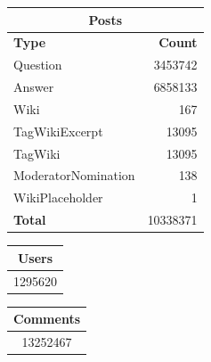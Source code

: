 \documentclass{article}
\begin{document}
\begin{table}[h]
\begin{minipage}[t]{0.45\linewidth}
\begin{tabular}[t]{| l | r |}
\hline
\multicolumn{2}{|c|}{Posts} \\ \hline
\bf{Type} & \bf{Count} \\ \hline
Question & 3453742 \\ \hline
Answer & 6858133 \\ \hline
Wiki & 167 \\ \hline
TagWikiExcerpt & 13095 \\ \hline
TagWiki & 13095 \\ \hline
ModeratorNomination & 138 \\ \hline
WikiPlaceholder & 1 \\ \hline 
\bf{Total} & 10338371 \\ \hline 
   
\end{tabular}

\vspace{\baselineskip}

\begin{tabular}[t]{| c |}
\hline
Users  \\ \hline
1295620 \\ \hline   
\end{tabular}


\vspace{\baselineskip}


\begin{tabular}[t]{| c |}
\hline
Comments  \\ \hline
13252467 \\ \hline   
\end{tabular}


\end{minipage}
\hspace{0.5cm}
\begin{minipage}[t]{0.45\linewidth}


\end{minipage}
\end{table}
\end{document}
